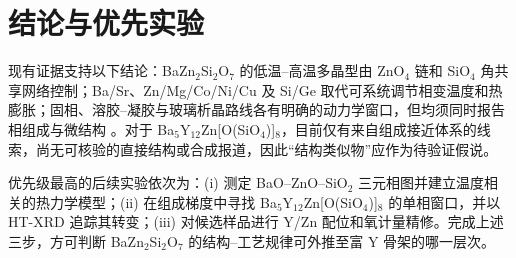 \section{结论与优先实验}

现有证据支持以下结论：BaZn$_2$Si$_2$O$_7$ 的低温--高温多晶型由 ZnO$_4$ 链和 SiO$_4$ 角共享网络控制；Ba\slash Sr、Zn\slash Mg\slash Co\slash Ni\slash Cu 及 Si\slash Ge 取代可系统调节相变温度和热膨胀；固相、溶胶--凝胶与玻璃析晶路线各有明确的动力学窗口，但均须同时报告相组成与微结构 \cite{lin1999phase,kerstan2012thermal,thieme2015ba1,thieme2016new,bocker2012in}。对于 Ba$_5$Y$_{12}$Zn[O(SiO$_4$)]$_8$，目前仅有来自组成接近体系的线索，尚无可核验的直接结构或合成报道，因此“结构类似物”应作为待验证假说。

优先级最高的后续实验依次为：(i) 测定 BaO--ZnO--SiO$_2$ 三元相图并建立温度相关的热力学模型；(ii) 在组成梯度中寻找 Ba$_5$Y$_{12}$Zn[O(SiO$_4$)]$_8$ 的单相窗口，并以 HT\nobreakdash-XRD 追踪其转变；(iii) 对候选样品进行 Y\slash Zn 配位和氧计量精修。完成上述三步，方可判断 BaZn$_2$Si$_2$O$_7$ 的结构--工艺规律可外推至富 Y 骨架的哪一层次。
